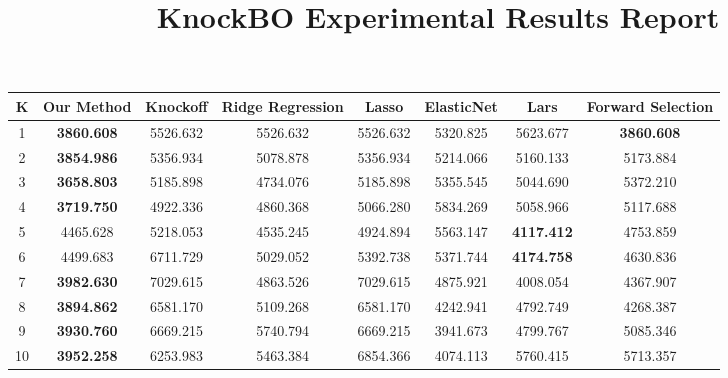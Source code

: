 \documentclass{article}
\title{KnockBO Experimental Results Report}
\begin{document}
\maketitle

\begin{table}
  \centering
  	\begin{tabular}{cccccccc}
	\toprule
	K & Our Method & Knockoff & Ridge Regression & Lasso & ElasticNet & Lars & Forward Selection \\
	\midrule
	1 & \textbf{3860.608} & 5526.632 & 5526.632 & 5526.632 & 5320.825 & 5623.677 & \textbf{3860.608} \\
	2 & \textbf{3854.986} & 5356.934 & 5078.878 & 5356.934 & 5214.066 & 5160.133 & 5173.884 \\
	3 & \textbf{3658.803} & 5185.898 & 4734.076 & 5185.898 & 5355.545 & 5044.690 & 5372.210 \\
	4 & \textbf{3719.750} & 4922.336 & 4860.368 & 5066.280 & 5834.269 & 5058.966 & 5117.688 \\
	5 & 4465.628 & 5218.053 & 4535.245 & 4924.894 & 5563.147 & \textbf{4117.412} & 4753.859 \\
	6 & 4499.683 & 6711.729 & 5029.052 & 5392.738 & 5371.744 & \textbf{4174.758} & 4630.836 \\
	7 & \textbf{3982.630} & 7029.615 & 4863.526 & 7029.615 & 4875.921 & 4008.054 & 4367.907 \\
	8 & \textbf{3894.862} & 6581.170 & 5109.268 & 6581.170 & 4242.941 & 4792.749 & 4268.387 \\
	9 & \textbf{3930.760} & 6669.215 & 5740.794 & 6669.215 & 3941.673 & 4799.767 & 5085.346 \\
	10 & \textbf{3952.258} & 6253.983 & 5463.384 & 6854.366 & 4074.113 & 5760.415 & 5713.357 \\
	\bottomrule
	\end{tabular}
\end{table}
\end{document}
